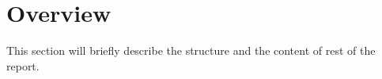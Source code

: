 \section{Overview}
\label{sec:overview}

This section will briefly describe the structure and the content of rest of the report. 
